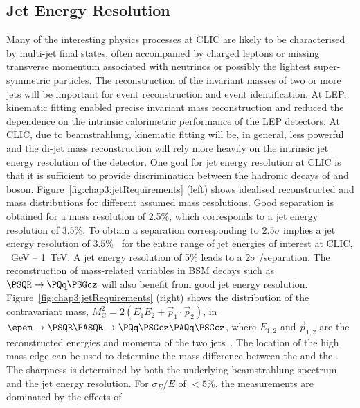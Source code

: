 \subsection{Jet Energy Resolution\label{sec:chapter3:requirements:jetenergy}}

Many of the interesting physics processes at CLIC are likely to be characterised
by multi-jet final states, often accompanied by charged leptons or missing
transverse momentum associated with neutrinos or possibly the lightest super-symmetric
particles. The reconstruction of the invariant masses of two or more jets will
be important for event reconstruction and event identification. At \acs{LEP},
kinematic fitting enabled precise invariant mass 
reconstruction and reduced the dependence on the intrinsic calorimetric
performance of the \acs{LEP} detectors. At CLIC, due to beamstrahlung, kinematic
fitting will be, in general, less powerful and the di-jet mass reconstruction
will rely more heavily on the intrinsic jet energy resolution of the detector. 
One goal for jet energy resolution at CLIC is that it is sufficient to
provide discrimination between the hadronic decays of \PW and \PZ boson.
Figure~\ref{fig:chap3:jetRequirements} (left) shows idealised reconstructed \PW and
\PZ mass distributions for different assumed mass resolutions. Good separation is obtained for 
a mass resolution of 2.5\%, which corresponds to a jet energy resolution of
3.5\%. To obtain a separation
corresponding to $2.5\sigma$ implies a jet energy resolution of
$3.5\%$~\cite{thomson:pandora} for the entire range of jet energies of
interest at CLIC, ~GeV -- 1~TeV. A jet energy resolution of 5\% leads to a $2\sigma$  \PW/\PZ separation. 
The reconstruction of mass-related
variables in \acs{BSM} decays such as $\PSQR\rightarrow\PQq\PSGcz$ will also benefit
from good jet energy resolution. Figure~\ref{fig:chap3:jetRequirements} (right) shows
the distribution of the contravariant mass,
$M^2_{\mathrm{C}}=2(E_1E_2+\vec{p}_1\cdot\vec{p}_2)$, in
$\epem\rightarrow\PSQR\PASQR\rightarrow\PQq\PSGcz\PAQq\PSGcz$, where $E_{1,2}$
and $\vec{p}_{1,2}$ are the reconstructed energies and momenta of the two jets~\cite{LCD-2010-012}.
The location of the high mass edge can be used to determine the mass
difference between the \PSQR and the \PSGcz. The sharpness is determined by
both the underlying beamstrahlung spectrum and the jet energy resolution. For
$\sigma_E/E$ of $<5\%$, the measurements are dominated by the effects of
